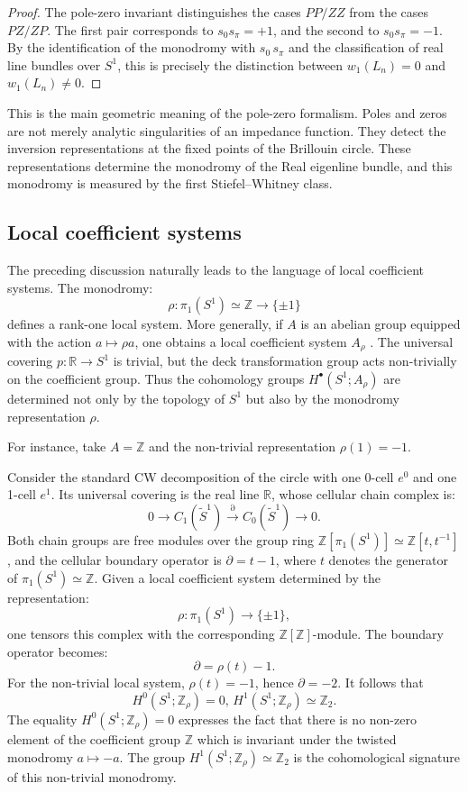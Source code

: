 \documentclass[preprint,12pt]{elsarticle}
\def\bbR{\mathbb R}
\def\bbZ{\mathbb Z}
\newtheorem{proof}{Proof}
\begin{document}
\begin{proof}
The pole-zero invariant distinguishes the cases $PP/ZZ$ from the cases $PZ/ZP$. The first pair corresponds to
$s_0s_\pi=+1$, and the second to $s_0s_\pi=-1$.
By the identification of the monodromy with $s_0\,s_\pi$ and the classification of real line bundles over $S^1$, this is precisely the distinction between $w_1(L_n)=0$ and $w_1(L_n)\neq0$.
\end{proof}

This is the main geometric meaning of the pole-zero formalism. Poles and zeros are not merely analytic singularities of an impedance function. They detect the inversion representations at the fixed points of the Brillouin circle. These representations determine the monodromy of the Real eigenline bundle, and this monodromy is measured by the first Stiefel--Whitney class.

\subsection{Local coefficient systems}

The preceding discussion naturally leads to the language of local coefficient systems.
The monodromy:
$$
\rho:\pi_1(S^1)\simeq\bbZ \longrightarrow \{\pm1 \}
$$
defines a rank-one local system. More generally, if $A$ is an abelian group equipped with the action
$a\longmapsto \rho a$, one obtains a local coefficient system $A_\rho$ \cite{hatcher,kirk}. The universal covering
$p:\mathbb R\to S^1$ is trivial, but the deck transformation group acts non-trivially on the coefficient group. Thus the cohomology groups
$H^\bullet(S^1;A_\rho)$ are determined not only by the topology of $S^1$ but also by the monodromy representation $\rho$.

For instance, take $A=\bbZ$ and the non-trivial representation $\rho(1)=-1$.

Consider the standard CW decomposition of the circle with one
0-cell $e^0$ and one 1-cell $e^1$. Its universal covering is the real line $\bbR$, whose cellular
chain complex is:
$$
0 \longrightarrow C_1(\widetilde S^1)
\xrightarrow{\partial}
C_0(\widetilde S^1)
\longrightarrow 0.
$$
Both chain groups are free modules over the group ring $\mathbb Z[\pi_1(S^1)]\simeq\bbZ[t,t^{-1}]$,
and the cellular boundary operator is $\partial = t-1$, where $t$ denotes the generator of $\pi_1(S^1)\simeq\bbZ$.
Given a local coefficient system determined by the representation:
$$
\rho:\pi_1(S^1)\to\{\pm1\},
$$
one tensors this complex with the corresponding $\bbZ[\bbZ]$-module.
The boundary operator becomes:
$$
\partial=\rho(t)-1.
$$
For the non-trivial local system, $\rho(t)=-1$, hence $\partial=-2$. It follows that
$$
H^0(S^1;\bbZ_\rho)=0,
\,
H^1(S^1;\bbZ_\rho)\simeq \bbZ_2.
$$
The equality $H^0(S^1;\bbZ_\rho)=0$ expresses the fact that there is no non-zero element of the coefficient group $\bbZ$
which is invariant under the twisted monodromy $a\mapsto -a$. The group $H^1(S^1;\bbZ_\rho)\simeq\bbZ_2$ is the cohomological signature of this non-trivial monodromy.
\end{document}
